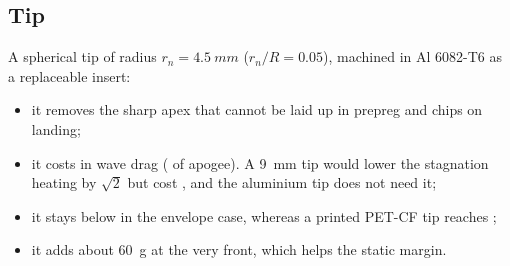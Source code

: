 \subsection{Tip}

A spherical tip of radius $r_n = \SI{4.5}{mm}$ ($r_n/R = 0.05$), machined in Al 6082-T6 as a
replaceable insert:
\begin{itemize}[leftmargin=*,itemsep=2pt]
\item it removes the sharp apex that cannot be laid up in prepreg and chips on landing;
\item it costs \BLUNTCOST{} in wave drag (\BLUNTAPOA{} of apogee). A \SI{9}{mm} tip would lower the
stagnation heating by $\sqrt2$ but cost \BLUNTAPOB{}, and the aluminium tip does not need it;
\item it stays below \TIPAL{} in the envelope case, whereas a printed PET-CF tip reaches
\PETENV{};
\item it adds about \SI{60}{g} at the very front, which helps the static margin.
\end{itemize}
